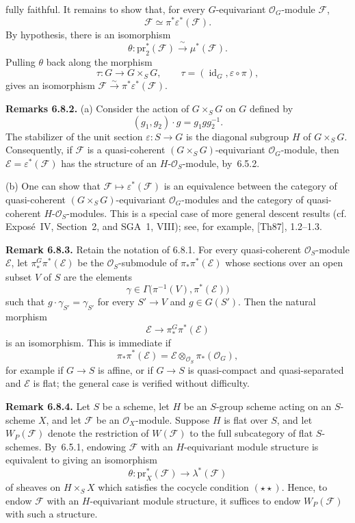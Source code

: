 fully faithful. It remains to show that, for every \(G\)-equivariant
\(\mathcal O_G\)-module \(\mathcal F\),
\[
  \mathcal F\simeq\pi^*\varepsilon^*(\mathcal F).
\]
By hypothesis, there is an isomorphism
\[
  \theta:\mathrm{pr}_2^*(\mathcal F)
  \xrightarrow{\ \sim\ }\mu^*(\mathcal F).
\]
Pulling \(\theta\) back along the morphism
\[
  \tau:G\longrightarrow G\times_SG,
  \qquad
  \tau=(\operatorname{id}_G,\varepsilon\circ\pi),
\]
gives an isomorphism
\(\mathcal F\xrightarrow{\sim}\pi^*\varepsilon^*(\mathcal F)\).

\medskip
\noindent\textbf{Remarks 6.8.2.}
(a) Consider the action of \(G\times_SG\) on \(G\) defined by
\[
  (g_1,g_2)\cdot g=g_1gg_2^{-1}.
\]
The stabilizer of the unit section \(\varepsilon:S\to G\) is the
diagonal subgroup \(H\) of \(G\times_SG\). Consequently, if
\(\mathcal F\) is a quasi-coherent
\((G\times_SG)\)-equivariant \(\mathcal O_G\)-module, then
\(\mathcal E=\varepsilon^*(\mathcal F)\) has the structure of an
\(H\)-\(\mathcal O_S\)-module, by~6.5.2.

(b) One can show that
\(\mathcal F\mapsto\varepsilon^*(\mathcal F)\) is an equivalence
between the category of quasi-coherent
\((G\times_SG)\)-equivariant \(\mathcal O_G\)-modules and the category
of quasi-coherent \(H\)-\(\mathcal O_S\)-modules. This is a special
case of more general descent results (cf. Expos\'e~IV, Section~2, and
SGA~1, VIII); see, for example, [Th87], 1.2--1.3.

\medskip
\noindent\textbf{Remark 6.8.3.}
Retain the notation of 6.8.1. For every quasi-coherent
\(\mathcal O_S\)-module \(\mathcal E\), let
\(\pi_*^G\pi^*(\mathcal E)\) be the \(\mathcal O_S\)-submodule of
\(\pi_*\pi^*(\mathcal E)\) whose sections over an open subset \(V\)
of \(S\) are the elements
\[
  \gamma\in\Gamma\bigl(\pi^{-1}(V),\pi^*(\mathcal E)\bigr)
\]
such that \(g\cdot\gamma_{S'}=\gamma_{S'}\) for every \(S'\to V\) and
\(g\in G(S')\). Then the natural morphism
\[
  \mathcal E\longrightarrow\pi_*^G\pi^*(\mathcal E)
\]
is an isomorphism. This is immediate if
\[
  \pi_*\pi^*(\mathcal E)
  =\mathcal E\otimes_{\mathcal O_S}\pi_*(\mathcal O_G),
\]
for example if \(G\to S\) is affine, or if \(G\to S\) is
quasi-compact and quasi-separated and \(\mathcal E\) is flat; the
general case is verified without difficulty.

\medskip
\noindent\textbf{Remark 6.8.4.}
Let \(S\) be a scheme, let \(H\) be an \(S\)-group scheme acting on an
\(S\)-scheme \(X\), and let \(\mathcal F\) be an
\(\mathcal O_X\)-module. Suppose \(H\) is flat over \(S\), and let
\(W_P(\mathcal F)\) denote the restriction of \(W(\mathcal F)\) to the
full subcategory of flat \(S\)-schemes. By~6.5.1, endowing
\(\mathcal F\) with an \(H\)-equivariant module structure is equivalent
to giving an isomorphism
\[
  \theta:\mathrm{pr}_X^*(\mathcal F)\longrightarrow\lambda^*(\mathcal F)
\]
of sheaves on \(H\times_SX\) which satisfies the cocycle condition
\((\star\star)\). Hence, to endow \(\mathcal F\) with an
\(H\)-equivariant module structure, it suffices to endow
\(W_P(\mathcal F)\) with such a structure.


